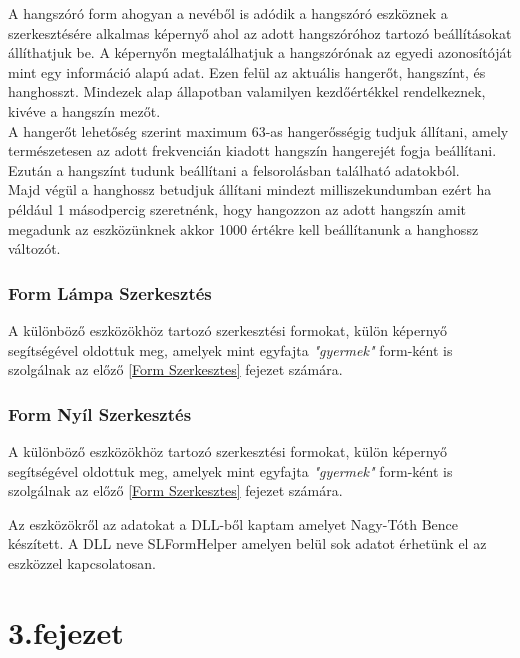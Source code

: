 \documentclass[tocnopagenum]{thesis-ekf}
\theoremstyle{definition}
\theoremstyle{remark}
\begin{document}
	A hangszóró form ahogyan a nevéből is adódik a hangszóró eszköznek a szerkesztésére alkalmas képernyő ahol az adott hangszóróhoz tartozó beállításokat állíthatjuk be.
	A képernyőn megtalálhatjuk a hangszórónak az egyedi azonosítóját mint egy információ alapú adat. Ezen felül az aktuális hangerőt, hangszínt, és hanghosszt. Mindezek alap állapotban valamilyen kezdőértékkel rendelkeznek, kivéve a hangszín mezőt.
	\\
	A hangerőt lehetőség szerint maximum 63-as hangerősségig tudjuk állítani, amely természetesen az adott frekvencián kiadott hangszín hangerejét fogja beállítani.
	\\
	Ezután a hangszínt tudunk beállítani a felsorolásban található adatokból.
	\\
	Majd végül a hanghossz betudjuk állítani mindezt milliszekundumban ezért ha például 1 másodpercig szeretnénk, hogy hangozzon az adott hangszín amit megadunk az eszközünknek akkor 1000 értékre kell beállítanunk a hanghossz változót.
	\subsection{Form Lámpa Szerkesztés}
	A különböző eszközökhöz tartozó szerkesztési formokat, külön képernyő segítségével oldottuk meg, amelyek mint egyfajta \textit{"gyermek"} form-ként is szolgálnak az előző \ref{Form Szerkesztes} fejezet számára.
	\subsection{Form Nyíl Szerkesztés}
	A különböző eszközökhöz tartozó szerkesztési formokat, külön képernyő segítségével oldottuk meg, amelyek mint egyfajta \textit{"gyermek"} form-ként is szolgálnak az előző \ref{Form Szerkesztes} fejezet számára.

	Az eszközökről az adatokat a DLL-ből kaptam amelyet Nagy-Tóth Bence készített. A DLL neve SLFormHelper amelyen belül sok adatot érhetünk el az eszközzel kapcsolatosan. %
	
	

	\chapter*{3.fejezet}

\end{document}
